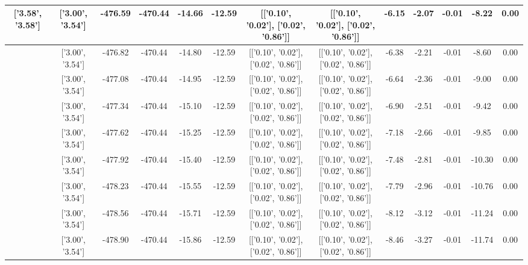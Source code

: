 \begin{table}[htbp]
\begin{adjustbox}{angle=90}
\begin{tabular}{|c|c|c|c|c|c|c|c|c|c|c|c|c|}
 ['3.58', '3.58'] & ['3.00', '3.54'] & -476.59 & -470.44 & -14.66 & -12.59 & [['0.10', '0.02'], ['0.02', '0.86']] & [['0.10', '0.02'], ['0.02', '0.86']] & -6.15 & -2.07 & -0.01 & -8.22 & 0.00\\ \hline
 ['3.62', '3.58'] & ['3.00', '3.54'] & -476.82 & -470.44 & -14.80 & -12.59 & [['0.10', '0.02'], ['0.02', '0.86']] & [['0.10', '0.02'], ['0.02', '0.86']] & -6.38 & -2.21 & -0.01 & -8.60 & 0.00\\ \hline
 ['3.66', '3.58'] & ['3.00', '3.54'] & -477.08 & -470.44 & -14.95 & -12.59 & [['0.10', '0.02'], ['0.02', '0.86']] & [['0.10', '0.02'], ['0.02', '0.86']] & -6.64 & -2.36 & -0.01 & -9.00 & 0.00\\ \hline
 ['3.70', '3.59'] & ['3.00', '3.54'] & -477.34 & -470.44 & -15.10 & -12.59 & [['0.10', '0.02'], ['0.02', '0.86']] & [['0.10', '0.02'], ['0.02', '0.86']] & -6.90 & -2.51 & -0.01 & -9.42 & 0.00\\ \hline
 ['3.73', '3.59'] & ['3.00', '3.54'] & -477.62 & -470.44 & -15.25 & -12.59 & [['0.10', '0.02'], ['0.02', '0.86']] & [['0.10', '0.02'], ['0.02', '0.86']] & -7.18 & -2.66 & -0.01 & -9.85 & 0.00\\ \hline
 ['3.77', '3.59'] & ['3.00', '3.54'] & -477.92 & -470.44 & -15.40 & -12.59 & [['0.10', '0.02'], ['0.02', '0.86']] & [['0.10', '0.02'], ['0.02', '0.86']] & -7.48 & -2.81 & -0.01 & -10.30 & 0.00\\ \hline
 ['3.81', '3.59'] & ['3.00', '3.54'] & -478.23 & -470.44 & -15.55 & -12.59 & [['0.10', '0.02'], ['0.02', '0.86']] & [['0.10', '0.02'], ['0.02', '0.86']] & -7.79 & -2.96 & -0.01 & -10.76 & 0.00\\ \hline
 ['3.85', '3.60'] & ['3.00', '3.54'] & -478.56 & -470.44 & -15.71 & -12.59 & [['0.10', '0.02'], ['0.02', '0.86']] & [['0.10', '0.02'], ['0.02', '0.86']] & -8.12 & -3.12 & -0.01 & -11.24 & 0.00\\ \hline
 ['3.89', '3.60'] & ['3.00', '3.54'] & -478.90 & -470.44 & -15.86 & -12.59 & [['0.10', '0.02'], ['0.02', '0.86']] & [['0.10', '0.02'], ['0.02', '0.86']] & -8.46 & -3.27 & -0.01 & -11.74 & 0.00\\ \hline
            \end{tabular}
        \end{adjustbox}
        \caption{}
        \label{}
    \end{table}
    